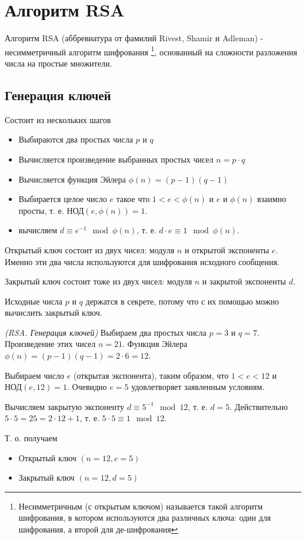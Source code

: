 \section{Алгоритм RSA}
\label{AddRSA}
Алгоритм RSA (аббревиатура от фамилий Rivest, Shamir и Adleman) - 
несимметричный алгоритм шифрования
\footnote{Несимметричным (с открытым ключом) называется такой алгоритм
  шифрования, в 
  котором используются два различных ключа: один для шифрования, а
  второй для де-шифрования},  
основанный на сложности разложения числа на простые множители.  

\subsection{Генерация ключей}
Состоит из нескольких шагов
\begin{itemize}
\item Выбираются два простых числа $p$ и $q$
\item Вычисляется произведение выбранных простых чисел $n = p\cdot q$
\item Вычисляется функция Эйлера 
\(
\phi\left(n\right)=\left(p - 1 \right)\left(q - 1 \right)
\)
\item Выбирается целое число $e$ такое что 
\(
1 < e < \phi\left(n\right)
\) и $e$ и $\phi\left(n\right)$ взаимно просты,
т. е. 
\(
\mbox{НОД}\left( e, \phi\left(n\right) \right) = 1.
\)
\item вычисляем $d \equiv e^{-1} \mod{\phi\left(n\right)}$, т. е.
$d \cdot e \equiv 1 \mod{\phi\left(n\right)}$.
\end{itemize}

Открытый ключ состоит из двух чисел: модуля $n$ и открытой экспоненты
$e$. Именно эти два числа используются для шифрования исходного
сообщения.

Закрытый ключ состоит тоже из двух чисел: модуля $n$ и закрытой экспоненты
$d$.

Исходные числа $p$ и $q$ держатся в секрете, потому что с их помощью
можно вычислить закрытый ключ.

\begin{example}
\emph{(RSA. Генерация ключей)}
Выбираем два простых числа  $p = 3$ и $q = 7$. Произведение этих чисел $n = 21$. Функция Эйлера 
\(
\phi\left(n\right)=\left(p - 1 \right)\left(q - 1 \right) = 2 \cdot 6 = 12
\). 

Выбираем число $e$  (открытая экспонента), таким образом, что $1 < e < 12$ и  
$\mbox{НОД}\left( e, 12 \right) = 1$. Очевидно $e = 5$ удовлетворяет заявленным условиям. 

Вычисляем закрытую экспоненту $d \equiv 5^{-1} \mod{12}$, т. е. $d = 5$. 
Действительно $5 \cdot 5 = 25 = 2 \cdot 12 + 1$, т. е. $5 \cdot 5 \equiv 1 \mod{12}$.

Т. о. получаем
\begin{itemize}
\item Открытый ключ $\left(n=12, e=5\right)$
\item Закрытый ключ $\left(n=12, d=5\right)$
\end{itemize}
\label{exAddRSAKeyGen}
\end{example}

